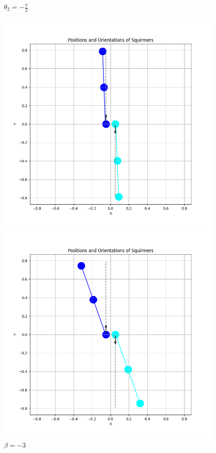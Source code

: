 \documentclass{article}
\begin{document}
\begin{figure}[H]
    \centering
    \textbf{$\theta_2 = -\frac{\pi}{2}$}\par\medskip
    \begin{minipage}{0.49\textwidth}
        \includegraphics[width=1.1\textwidth]{graphs/simulations/sim_sq_sq/betam3/mpi_2_.png}
        \caption{\footnotesize $\beta = -3$}
    \end{minipage}\hfill
    \begin{minipage}{0.49\textwidth}
        \includegraphics[width=1.1\textwidth]{graphs/simulations/sim_sq_sq/beta3/mpi_2_.png}

\end{minipage}
\end{figure}
\end{document}

